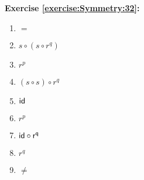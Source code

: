 \noindent\textbf{Exercise \ref{exercise:Symmetry:32}:}
%
%
\begin{multicols}{3}
\begin{enumerate}
\item
$=$

\item
$s \circ (s \circ r^q)$

\item
$r^p$

\item
$(s \circ s) \circ r^q$

\item
$\sf{id}$

\item
$r^p$

\item
$\sf{id} \circ r^q$

\item
$r^q$


\item
$\neq$
\end{enumerate}
\end{multicols}


